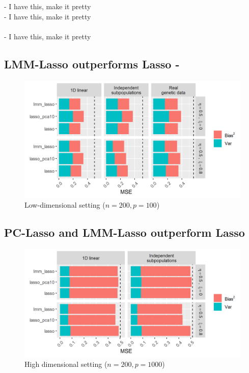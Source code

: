  - I have this, make it pretty\\

- I have this, make it pretty\\

\\

- I have this, make it pretty\\



\subsection{LMM-Lasso outperforms Lasso - }
\begin{figure}[H]
    \centering
    \includegraphics[scale = 0.7]{figures/fig1a.png}
    \caption{Low-dimensional setting ($n=200, p=100$)}
    \label{fig:ld}
\end{figure}

\subsection{PC-Lasso and LMM-Lasso outperform Lasso}
\begin{figure}[H]
    \centering
    \includegraphics[scale = 0.7]{figures/fig1b.png}
    \caption{High dimensional setting ($n=200, p=1000$)}
    \label{fig:hd}
\end{figure}

